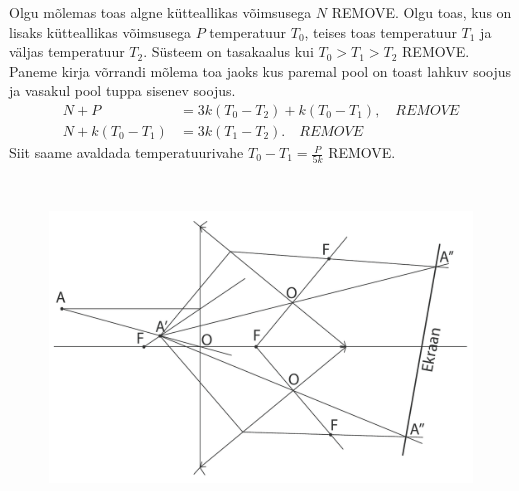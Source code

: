 \documentclass[10pt]{article}
\newcommand{\p}[1]{REMOVE}
\begin{document}

\solu
Olgu mõlemas toas algne kütteallikas võimsusega $N$ \p{0,5}. Olgu toas, kus on lisaks kütteallikas võimsusega $P$ temperatuur $T_0$, teises toas temperatuur $T_1$ ja väljas temperatuur $T_2$. Süsteem on tasakaalus kui $T_0 > T_1 > T_2$ \p{0,5}. Paneme kirja võrrandi mõlema toa jaoks kus paremal pool on toast lahkuv soojus ja vasakul pool tuppa sisenev soojus.
\begin{align*}
  N+P&=3k(T_0 - T_2)+k(T_0-T_1), \quad \p2\\
  N+k(T_0-T_1)&=3k(T_1 - T_2). \quad \p2
\end{align*}
Siit saame avaldada temperatuurivahe $T_0-T_1=\frac{P}{5k}$ \p3.
\probend
\bigskip


\solu
\

\begin{figure}[h]
    \centering
    \includegraphics[scale=0.5]{2022-v3g-04-yl.pdf}
\end{figure}
\probend
\bigskip

\end{document}
